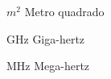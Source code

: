 \begin{simbolos}
  \item[$ m^2 $] Metro quadrado
  \item[GHz] Giga-hertz
  \item[MHz] Mega-hertz
\end{simbolos}